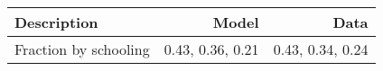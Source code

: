 \begin{tabular}{lrr}
\hline
Description & Model  & Data  \\ 
\hline
Fraction by schooling & 0.43, 0.36, 0.21  & 0.43, 0.34, 0.24  \\ 
\hline
\end{tabular}%
